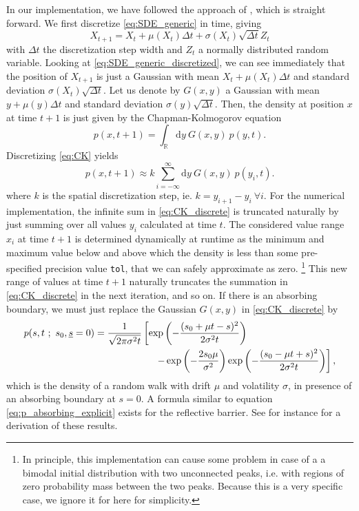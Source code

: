\documentclass[11pt]{article}
\newcommand{\dd}{\mathrm{d}} %
\begin{document}
In our implementation, we have followed the approach of \cite{Bhat2016}, which is straight forward. 
We first discretize \eqref{eq:SDE_generic} in time, giving
\begin{equation}
	X_{t+1} = X_t +  \mu(X_t) \Delta t + \sigma(X_t) \sqrt{ \Delta t} Z_t
	\label{eq:SDE_generic_discretized}
\end{equation}
with $\Delta t$ the discretization step width and $Z_t$ a normally distributed random variable. 
Looking at \eqref{eq:SDE_generic_discretized}, we can see immediately that the position of $X_{t+1}$ is just a 
Gaussian with mean $X_t +  \mu(X_t) \Delta t$ and standard deviation $\sigma(X_t) \sqrt{ \Delta t}$. 
Let us denote by $G(x,y)$ a Gaussian with mean $y+\mu(y) \Delta t$ and standard deviation $\sigma(y) \sqrt{ \Delta t}$. 
Then, the density at position $x$ at time $t+1$ is just given by the Chapman-Kolmogorov equation 
\begin{equation}
	p(x, t+1) = \int_{\mathbb{R}} \dd y ~ G(x, y) ~ p(y, t). 
	\label{eq:CK}
\end{equation}
Discretizing \eqref{eq:CK} yields 
\begin{equation}
	p(x, t+1) \approx k  \sum_{i=-\infty}^\infty  \dd y ~ G(x, y) ~ p(y_i, t). 
	\label{eq:CK_discrete}
\end{equation}
where $k$ is the spatial discretization step, ie. $k = y_{i+1}-y_i ~ \forall i$. 
For the numerical implementation, the infinite sum in \eqref{eq:CK_discrete} is truncated naturally by just summing over all values $y_i$ calculated at time $t$. 
The considered value range $x_i$ at time $t+1$ is determined dynamically at runtime as the minimum and maximum value below and above
which the density is less than some pre-specified precision value \texttt{tol}, that we can safely approximate as zero. 
\footnote{
In principle, this implementation can cause some problem in case of a a bimodal initial distribution with two unconnected peaks, 
i.e. with regions of zero probability mass between the two peaks. 
Because this is a very specific case, we ignore it for here for simplicity. 
} 
This new range of values at time $t+1$ naturally truncates the summation in \eqref{eq:CK_discrete} in the next iteration, and so on. 
If there is an absorbing boundary, we must just replace the Gaussian $G(x,y)$ in \eqref{eq:CK_discrete} by 
\begin{align}
	p(s, t ~ ; ~s_0, \underline{s}=0) = \frac{1}{\sqrt{2 \pi \sigma^2 t}} &
 							\left[
 							 \exp \left( - \frac{ ( s_0 + \mu t - s )^2 }{2 \sigma^2 t}   \right) \right.  \notag \\
							 &~~~~							 
 							\left.  - \exp \left( - \frac{2 s_0 \mu}{\sigma^2} \right) 
							 \exp \left(- \frac{  ( s_0 - \mu t + s )^2 }{2 \sigma^2 t} \right) 							 
 							 \right],
							 \label{eq:p_absorbing_explicit}
\end{align} 
which is the density of a random walk with drift $\mu$ and volatility $\sigma$, in presence of an absorbing boundary at $s = 0$. 
A formula similar to equation \eqref{eq:p_absorbing_explicit} exists for the reflective barrier. 
See for  instance \cite{Molini2011} for a derivation of these results. 
\end{document}
